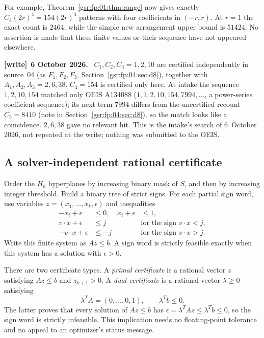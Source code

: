\documentclass[11pt,letterpaper]{article}
\numberwithin{equation}{section}
\theoremstyle{definition}
\theoremstyle{remark}
\newcommand{\1}{\mathbf 1}
\newenvironment{writenote}[1][]{\par\smallskip\begingroup\small
 \noindent\textbf{[write]}\if\relax\detokenize{#1}\relax\else~\textbf{#1.}\fi\ }%
 {\par\endgroup\smallskip}
\begin{document}
For example, Theorem~\ref{gsr:fp:01:thm:range} now gives exactly
$C_4(2r)^4=154(2r)^4$ patterns with four coefficients in $(-r,r)$.
At $r=1$ the exact count is $2464$, while the simple new arrangement
upper bound is $51424$. No assertion is made that these finite values
or their sequence have not appeared elsewhere.
\begin{writenote}[6 October 2026]
$C_1,C_2,C_3=1,2,10$ are certified independently in source~04 (as $F_1,F_2,F_3$, Section~\ref{gsr:fp:04:sec:d8}), together with $A_1,A_2,A_3=2,6,38$. $C_4=154$ is certified only here. At intake the sequence $1,2,10,154$ matched only OEIS A134088 ($1,1,2,10,154,7994,\ldots$, a power-series coefficient sequence); its next term $7994$ differs from the uncertified recount $C_5=8410$ (note in Section~\ref{gsr:fp:04:sec:d8}), so the match looks like a coincidence. $2,6,38$ gave no relevant hit. This is the intake's search of 6~October 2026, not repeated at the write; nothing was submitted to the OEIS.
\end{writenote}

\subsection{A solver-independent rational certificate}
Order the $H_k$ hyperplanes by increasing binary mask of $S$, and then
by increasing integer threshold. Build a binary tree of strict signs.
For each partial sign word, use variables
$z=(x_1,\ldots,x_k,\epsilon)$ and inequalities
\begin{align*}
 -x_i+\epsilon&\le0,&x_i+\epsilon&\le1,\\
 v\cdot x+\epsilon&\le j&&\text{for the sign }v\cdot x<j,\\
 -v\cdot x+\epsilon&\le-j&&\text{for the sign }v\cdot x>j.
\end{align*}
Write this finite system as $Az\le b$. A sign word is strictly feasible
exactly when this system has a solution with $\epsilon>0$.

There are two certificate types.
A \emph{primal certificate} is a rational vector $z$ satisfying
$Az\le b$ and $z_{k+1}>0$.
A \emph{dual certificate} is a rational vector $\lambda\ge0$ satisfying
\begin{equation}\label{gsr:fp:01:eq:dualcert}
 \lambda^TA=(0,\ldots,0,1),\qquad \lambda^Tb\le0.
\end{equation}
The latter proves that every solution of $Az\le b$ has
$\epsilon=\lambda^TAz\le\lambda^Tb\le0$, so the sign word is strictly
infeasible. This implication needs no floating-point tolerance and no
appeal to an optimizer's status message.
\end{document}
